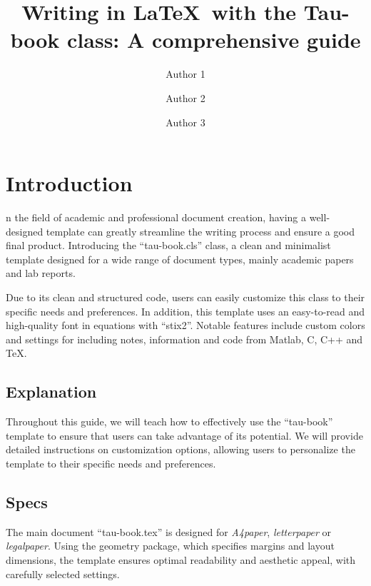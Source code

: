 \documentclass[10pt,a4paper,twoside]{main}
\title{Writing in \LaTeX\ with the Tau-book class: A comprehensive guide}
\author[a,1]{Author 1}
\author[b,2]{Author 2}
\author[b,c,3]{Author 3}
\affil[a]{Department of Mathematics}
\affil[b]{Department of Biology}
\affil[c]{University of Alpha}
\begin{document}
    \maketitle
    \abscontent
    \thispagestyle{firststyle}


\section{Introduction}

    n the field of academic and professional document creation, having a well-designed template can greatly streamline the writing process and ensure a good final product. Introducing the ``tau-book.cls'' class, a clean and minimalist template designed for a wide range of document types, mainly academic papers and lab reports.

    Due to its clean and structured code, users can easily customize this class to their specific needs and preferences. In addition, this template uses an easy-to-read and high-quality font in equations with ``stix2''. Notable features include custom colors and settings for including notes, information and code from Matlab, C, C++ and \TeX.

    \subsection{Explanation}

        Throughout this guide, we will teach how to effectively use the ``tau-book'' template to ensure that users can take advantage of its potential. We will provide detailed instructions on customization options, allowing users to personalize the template to their specific needs and preferences.

    \subsection{Specs}

        The main document ``tau-book.tex'' is designed for \textit{A4paper}, \textit{letterpaper} or \textit{legalpaper}. Using the geometry package, which specifies margins and layout dimensions, the template ensures optimal readability and aesthetic appeal, with carefully selected settings.
\end{document}
